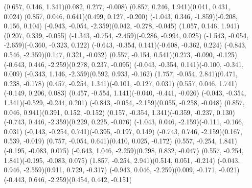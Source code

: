 \pstThreeDLine[linecolor=black](0.657, 0.146, 1.341)(0.082, 0.277, -0.008)
\pstThreeDLine[linecolor=black](0.857, 0.246, 1.941)(0.041, 0.431, 0.024)
\pstThreeDLine[linecolor=black](0.857, 0.046, 0.641)(0.499, 0.127, -0.200)
\pstThreeDLine[linecolor=gray](-1.043, 0.346, -1.859)(-0.208, 0.156, 0.104)
\pstThreeDLine[linecolor=gray](-0.943, -0.054, -2.359)(0.042, -0.278, -0.045)
\pstThreeDLine[linecolor=black](1.057, 0.146, 1.941)(0.207, 0.339, -0.055)
\pstThreeDLine[linecolor=gray](-1.343, -0.754, -2.459)(-0.286, -0.994, 0.025)
\pstThreeDLine[linecolor=gray](-1.543, -0.054, -2.659)(-0.360, -0.323, 0.122)
\pstThreeDLine[linecolor=gray](-0.643, -0.354, 0.141)(-0.608, -0.362, 0.224)
\pstThreeDLine[linecolor=gray](-0.843, 0.546, -2.359)(0.147, 0.321, -0.032)
\pstThreeDLine[linecolor=black](0.557, -0.154, 0.541)(0.273, -0.090, -0.125)
\pstThreeDLine[linecolor=gray](-0.643, 0.446, -2.259)(0.278, 0.237, -0.095)
\pstThreeDLine[linecolor=black](-0.043, -0.354, 0.141)(-0.100, -0.341, 0.009)
\pstThreeDLine[linecolor=gray](-0.343, 1.146, -2.359)(0.592, 0.933, -0.162)
\pstThreeDLine[linecolor=black](1.757, -0.054, 2.841)(0.471, 0.238, -0.178)
\pstThreeDLine[linecolor=black](0.457, -0.254, 1.341)(-0.101, -0.127, 0.031)
\pstThreeDLine[linecolor=black](0.557, 0.046, 1.741)(-0.149, 0.206, 0.083)
\pstThreeDLine[linecolor=black](0.457, -0.554, 1.141)(-0.040, -0.441, -0.026)
\pstThreeDLine[linecolor=black](-0.043, -0.354, 1.341)(-0.529, -0.244, 0.201)
\pstThreeDLine[linecolor=gray](-0.843, -0.054, -2.159)(0.055, -0.258, -0.048)
\pstThreeDLine[linecolor=black](0.857, 0.046, 0.941)(0.391, 0.152, -0.152)
\pstThreeDLine[linecolor=black](0.157, -0.354, 1.341)(-0.359, -0.237, 0.130)
\pstThreeDLine[linecolor=gray](-0.743, 0.446, -2.359)(0.229, 0.225, -0.076)
\pstThreeDLine[linecolor=gray](-1.043, 0.046, -2.159)(-0.111, -0.166, 0.031)
\pstThreeDLine[linecolor=black](-0.143, -0.254, 0.741)(-0.395, -0.197, 0.149)
\pstThreeDLine[linecolor=gray](-0.743, 0.746, -2.159)(0.167, 0.539, -0.019)
\pstThreeDLine[linecolor=black](0.757, -0.054, 0.641)(0.410, 0.025, -0.172)
\pstThreeDLine[linecolor=black](0.557, -0.254, 1.841)(-0.195, -0.083, 0.075)
\pstThreeDLine[linecolor=gray](-0.643, 1.046, -2.259)(0.298, 0.832, -0.047)
\pstThreeDLine[linecolor=black](0.557, -0.254, 1.841)(-0.195, -0.083, 0.075)
\pstThreeDLine[linecolor=black](1.857, -0.254, 2.941)(0.514, 0.051, -0.214)
\pstThreeDLine[linecolor=gray](-0.043, 0.946, -2.559)(0.911, 0.729, -0.317)
\pstThreeDLine[linecolor=gray](-0.943, 0.046, -2.259)(0.009, -0.171, -0.021)
\pstThreeDLine[linecolor=gray](-0.443, 0.646, -2.259)(0.454, 0.442, -0.151)
